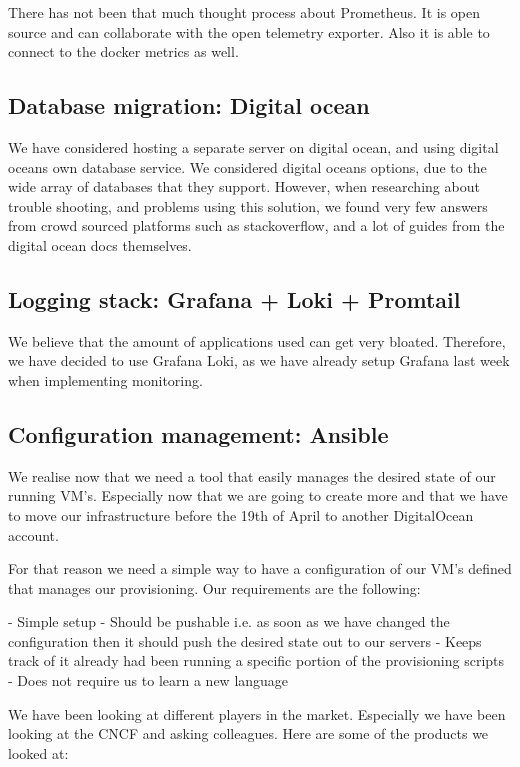 There has not been that much thought process about Prometheus. It is open source and can collaborate with the open telemetry exporter. Also it is able to connect to the docker metrics as well.

\subsection{Database migration: Digital ocean}

We have considered hosting a separate server on digital ocean, and using digital oceans own database service. We considered digital oceans options, due to the wide array of databases that they support. However, when researching about trouble shooting, and problems using this solution, we found very few answers from crowd sourced platforms such as stackoverflow, and a lot of guides from the digital ocean docs themselves.

\subsection{Logging stack: Grafana + Loki + Promtail}

We believe that the amount of applications used can get very bloated. Therefore, we have decided to use Grafana Loki, as we have already setup Grafana last week when implementing monitoring.

\subsection{Configuration management: Ansible}

We realise now that we need a tool that easily manages the desired state of our running VM’s. Especially now that we are going to create more and that we have to move our infrastructure before the 19th of April to another DigitalOcean account.

For that reason we need a simple way to have a configuration of our VM’s defined that manages our provisioning. Our requirements are the following:

- Simple setup
- Should be pushable i.e. as soon as we have changed the configuration then it should push the desired state out to our servers
- Keeps track of it already had been running a specific portion of the provisioning scripts
- Does not require us to learn a new language

We have been looking at different players in the market. Especially we have been looking at the CNCF and asking colleagues. Here are some of the products we looked at:

